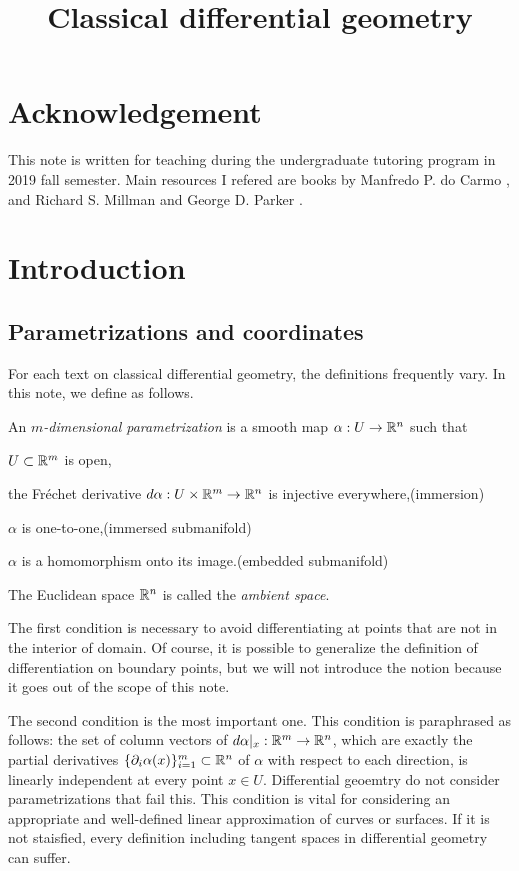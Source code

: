\documentclass{../exp}
\title{Classical differential geometry}
\def\a{\alpha}
\begin{document}
\maketitle
\tableofcontents


\section*{Acknowledgement}
This note is written for teaching during the undergraduate tutoring program in 2019 fall semester.
Main resources I refered are books by Manfredo P. do Carmo \cite{}, and Richard S. Millman and George D. Parker \cite{}.

\section{Introduction}
\subsection{Parametrizations and coordinates}
For each text on classical differential geometry, the definitions frequently vary.
In this note, we define as follows.
\begin{defn}
An \emph{$m$-dimensional parametrization} is a smooth map $\a:U\to\R^n$ such that
\begin{cond}
\item $U\subset\mathbb{R}^m$ is open,
\item the Fr\'echet derivative $d\a:U\times\R^m\to\R^n$ is injective everywhere,\hfill(immersion)
\item $\a$ is one-to-one,\hfill(immersed submanifold)
\item $\a$ is a homomorphism onto its image.\hfill(embedded submanifold)
\end{cond}
The Euclidean space $\mathbb{R}^n$ is called the \emph{ambient space}.
\end{defn}

The first condition is necessary to avoid differentiating at points that are not in the interior of domain.
Of course, it is possible to generalize the definition of differentiation on boundary points, but we will not introduce the notion because it goes out of the scope of this note.

The second condition is the most important one.
This condition is paraphrased as follows: the set of column vectors of $d\a|_x:\R^m\to\R^n$, which are exactly the partial derivatives $\{\pd_i\a(x)\}_{i=1}^m\subset\R^n$ of $\a$ with respect to each direction, is linearly independent at every point $x\in U$.
Differential geoemtry do not consider parametrizations that fail this.
This condition is vital for considering an appropriate and well-defined linear approximation of curves or surfaces.
If it is not staisfied, every definition including tangent spaces in differential geometry can suffer.
\end{document}
